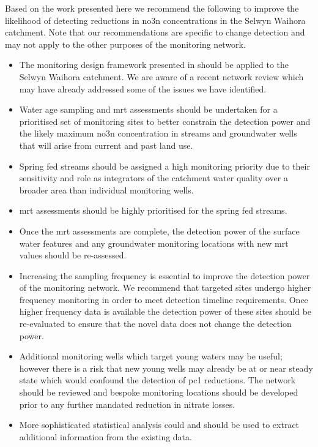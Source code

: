 Based on the work presented here we recommend the following to improve the likelihood of detecting reductions in \gls{no3n} concentrations in the Selwyn Waihora catchment.
Note that our recommendations are specific to change detection and may not apply to the other purposes of the monitoring network.
\begin{itemize}
    \item The monitoring design framework presented in \citet{olw_guidance} should be applied to the Selwyn Waihora catchment. We are aware of a recent network review which may have already addressed some of the issues we have identified.
    \item Water age sampling and \gls{mrt} assessments should be undertaken for a prioritised set of monitoring sites to better constrain the detection power and the likely maximum \gls{no3n} concentration in streams and groundwater wells that will arise from current and past land use.
    \item Spring fed streams should be assigned a high monitoring priority due to their sensitivity and role as integrators of the catchment water quality over a broader area than individual monitoring wells.
    \item \gls{mrt} assessments should be highly prioritised for the spring fed streams.
    \item Once the \gls{mrt} assessments are complete, the detection power of the surface water features and any groundwater monitoring locations with new \gls{mrt} values should be re-assessed.
    \item Increasing the sampling frequency is essential to improve the detection power of the monitoring network. We recommend that targeted sites undergo higher frequency monitoring in order to meet detection timeline requirements. Once higher frequency data is available the detection power of these sites should be re-evaluated to ensure that the novel data does not change the detection power.
    \item Additional monitoring wells which target young waters may be useful; however there is a risk that new young wells may already be at or near steady state which would confound the detection of \gls{pc1} reductions. The network should be reviewed and bespoke monitoring locations should be developed prior to any further mandated reduction in nitrate losses.
    \item More sophisticated statistical analysis could and should be used to extract additional information from the existing data.
\end{itemize}